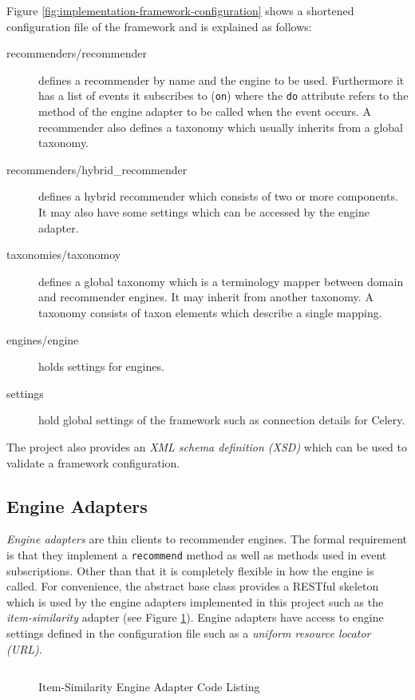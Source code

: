 Figure \ref{fig:implementation-framework-configuration} shows a shortened configuration file of the framework and is explained as follows:

\begin{description}
    \item[recommenders/recommender] defines a recommender by name and the engine to be used. Furthermore it has a list of events it subscribes to (\texttt{on}) where the \texttt{do} attribute refers to the method of the engine adapter to be called when the event occurs. A recommender also defines a taxonomy which usually inherits from a global taxonomy.
    \item[recommenders/hybrid_recommender] defines a hybrid recommender which consists of two or more components. It may also have some settings which can be accessed by the engine adapter.
    \item[taxonomies/taxonomoy] defines a global taxonomy which is a terminology mapper between domain and recommender engines. It may inherit from another taxonomy. A taxonomy consists of taxon elements which describe a single mapping.
    \item[engines/engine] holds settings for engines.
    \item[settings] hold global settings of the framework such as connection details for Celery.
\end{description}

The project also provides an \emph{XML schema definition (XSD)} which can be used to validate a framework configuration.

\subsection{Engine Adapters}
\label{implementation-framework-engine-adapter}

\emph{Engine adapters} are thin clients to recommender engines. The formal requirement is that they implement a \texttt{recommend} method as well as methods used in event subscriptions. Other than that it is completely flexible in how the engine is called. For convenience, the abstract base class provides a RESTful skeleton which is used by the engine adapters implemented in this project such as the \emph{item-similarity} adapter (see Figure \ref{fig:implementation-framework-engine-adapter}). Engine adapters have access to engine settings defined in the configuration file such as a \emph{uniform resource locator (URL)}.

\begin{figure}[!ht]
    \inputminted{py}{./includes/source/framework/engines/item\string_similarity.py}
    \caption{Item-Similarity Engine Adapter Code Listing}
    \label{fig:implementation-framework-engine-adapter}
\end{figure}

